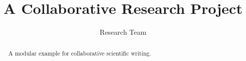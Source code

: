 \documentclass[11pt]{article}
\title{A Collaborative Research Project}
\author{Research Team}
\date{}
\begin{document}
\maketitle
\begin{abstract}
A modular example for collaborative scientific writing.
\end{abstract}








\end{document}
